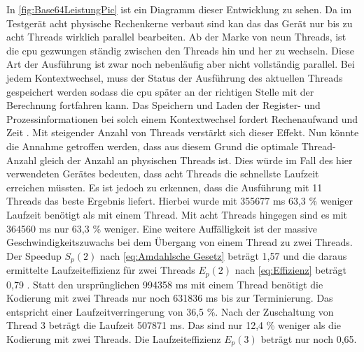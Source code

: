 In \autoref{fig:Base64LeistungPic} ist ein Diagramm dieser Entwicklung zu sehen. Da im Testgerät acht physische Rechenkerne verbaut sind kan das das Gerät nur bis zu acht Threads wirklich parallel bearbeiten. Ab der Marke von neun Threads, ist die \ac{cpu} gezwungen ständig zwischen den Threads hin und her zu wechseln. Diese Art der Ausführung ist zwar noch nebenläufig aber nicht vollständig parallel. Bei jedem Kontextwechsel, muss der Status der Ausführung des aktuellen Threads gespeichert werden sodass die \ac{cpu} später an der richtigen Stelle mit der Berechnung fortfahren kann. Das Speichern und Laden der Register- und Prozessinformationen bei solch einem Kontextwechsel fordert Rechenaufwand und Zeit \cite[2]{MultiThreadingThesis}. Mit steigender Anzahl von Threads verstärkt sich dieser Effekt. Nun könnte die Annahme getroffen werden, dass aus diesem Grund die optimale Thread-Anzahl gleich der Anzahl an physischen Threads ist. Dies würde im Fall des hier verwendeten Gerätes bedeuten, dass acht Threads die schnellste Laufzeit erreichen müssten. Es ist jedoch zu erkennen, dass die Ausführung mit 11 Threads das beste Ergebnis liefert. Hierbei wurde mit 355677 \ac{ms} 63,3 \% weniger Laufzeit benötigt als mit einem Thread. Mit acht Threads hingegen sind es mit 364560 \ac{ms} nur 63,3 \% weniger. Eine weitere Auffälligkeit ist der massive Geschwindigkeitszuwachs bei dem Übergang von einem Thread zu zwei Threads. Der Speedup $S_{p}(2)$ nach \autoref{eq:Amdahlsche Gesetz} beträgt 1,57 und die daraus ermittelte Laufzeiteffizienz für zwei Threads $E_{ p }(2)$ nach \autoref{eq:Effizienz} beträgt 0,79 . Statt den ursprünglichen 994358 \ac{ms} mit einem Thread benötigt die Kodierung mit zwei Threads nur noch 631836 \ac{ms} bis zur Terminierung. Das entspricht einer Laufzeitverringerung von  36,5 \%. Nach der Zuschaltung von Thread 3 beträgt die Laufzeit 507871 \ac{ms}. Das sind nur 12,4 \% weniger als die Kodierung mit zwei Threads. Die Laufzeiteffizienz $E_{ p }(3)$ beträgt nur noch 0,65. 

